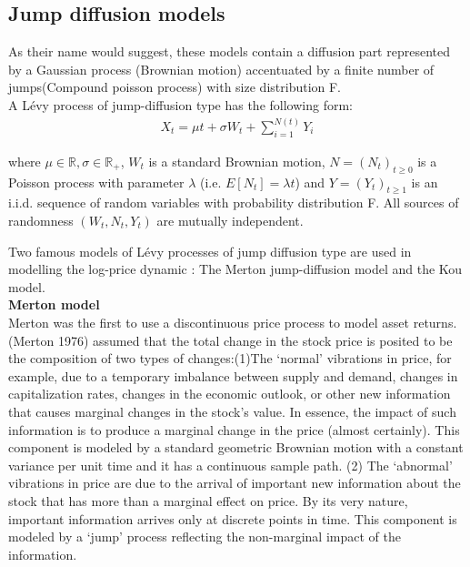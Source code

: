 \documentclass[12pt]{report}
\begin{document}
\subsection{Jump diffusion models}
As their name would suggest, these models contain  a diffusion part represented by a Gaussian process (Brownian motion) accentuated by a finite number of jumps(Compound poisson process) with size distribution F.      \\


A Lévy process of jump-diffusion type has the following form: 
\begin{gather}
X_t = \mu t+\sigma W_t+\sum_{i=1}^{N(t)} Y_i
\label{bar}
\end{gather}

where $\mu \in \mathbb{R}, \sigma \in \mathbb{R_+}$, $W_t$ is a standard Brownian motion, $N =(N_t)_{t \geqslant 0}$ is a Poisson process with parameter $\lambda$ (i.e. $E[N_t] = \lambda t$) and $Y = (Y_t)_{t\geqslant 1}$ is an i.i.d. sequence of random variables with probability distribution F. All sources of
randomness $(W_t,N_t,Y_t)$ are mutually independent.

Two famous models of Lévy processes of jump diffusion type are used in modelling the log-price dynamic : The Merton jump-diffusion model and the Kou model.\\

\large\textbf{Merton model}\\


Merton was the first to use a discontinuous price process to model asset returns. (Merton 1976) assumed that the total change in the stock price is posited to be the composition of two types of changes:(1)The ‘normal’ vibrations in price, for example, due to a temporary imbalance between supply and demand, changes in capitalization rates, changes in the economic outlook, or other new information that causes
marginal changes in the stock’s value. In essence, the impact of such information is to produce a marginal change in the price
(almost certainly). This component is modeled by a standard geometric Brownian
motion with a constant variance per unit time and it has a continuous sample
path. (2) The ‘abnormal’ vibrations in price are due to the arrival of important new information about the stock that has more than a marginal effect on price. By its very nature, important information arrives only
at discrete points in time. This component is modeled by a ‘jump’ process reflecting the non-marginal impact of the information.\\
\end{document}
